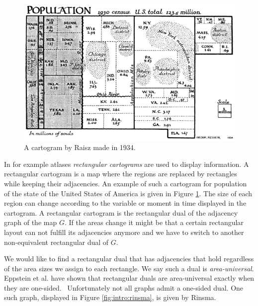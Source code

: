   \begin{figure}[!t]
    \centering
    \includegraphics[scale=.5]{introduction/img/cartogram.png}
    \caption{A cartogram by Raisz made in 1934.}
    \label{fig:intro:raisz}
  \end{figure}

  In for example atlases \emph{rectangular cartograms} are used to display information. A rectangular cartogram is a map where the regions are replaced by rectangles while keeping their adjacencies. An example of such a cartogram for population of the state of the United States of America is given in Figure \ref{fig:intro:raisz}. The size of each region can change according to the variable or moment in time displayed in the cartogram.  A rectangular cartogram is the rectangular dual of the adjacency graph of the map $G$.
  If the areas change it might be that a certain rectangular layout can not fulfill its adjacencies anymore and we have to switch to another non-equivalent rectangular dual of $G$.

  We would like to find a rectangular dual that has adjacencies that hold regardless of the area sizes we assign to each rectangle. We say such a dual is \emph{area-universal}.
  Eppstein et al. have shown that rectangular duals are area-universal exactly when they are one-sided.~\cite{Eppstein2012} Unfortunately not all graphs admit a one-sided dual. One such graph, displayed in Figure \ref{fig:intro:rinsma},  is given by Rinsma.~\cite{Rinsma1987}


